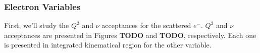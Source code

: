 \subsubsection{Electron Variables}
\label{14.21::electron_variables}
    First, we'll study the $Q^2$ and $\nu$ acceptances for the scattered $e^-$.
    $Q^2$ and $\nu$ acceptances are presented in Figures \textbf{TODO} and \textbf{TODO}, respectively.
    Each one is presented in integrated kinematical region for the other variable.

